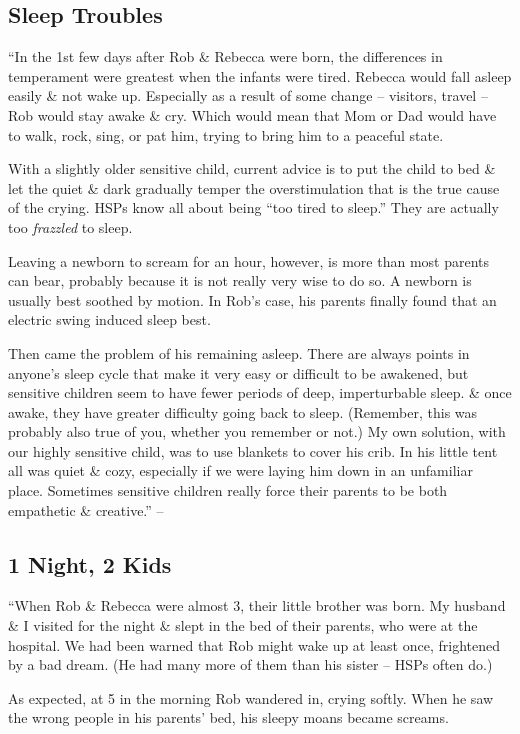 \documentclass{article}
\numberwithin{equation}{section}
\begin{document}
\subsection{Sleep Troubles}
``In the 1st few days after Rob \& Rebecca were born, the differences in temperament were greatest when the infants were tired. Rebecca would fall asleep easily \& not wake up. Especially as a result of some change -- visitors, travel -- Rob would stay awake \& cry. Which would mean that Mom or Dad would have to walk, rock, sing, or pat him, trying to bring him to a peaceful state.

With a slightly older sensitive child, current advice is to put the child to bed \& let the quiet \& dark gradually temper the overstimulation that is the true cause of the crying. HSPs know all about being ``too tired to sleep.'' They are actually too \textit{frazzled} to sleep.

Leaving a newborn to scream for an hour, however, is more than most parents can bear, probably because it is not really very wise to do so. A newborn is usually best soothed by motion. In Rob's case, his parents finally found that an electric swing induced sleep best.

Then came the problem of his remaining asleep. There are always points in anyone's sleep cycle that make it very easy or difficult to be awakened, but sensitive children seem to have fewer periods of deep, imperturbable sleep. \& once awake, they have greater difficulty going back to sleep. (Remember, this was probably also true of you, whether you remember or not.) My own solution, with our highly sensitive child, was to use blankets to cover his crib. In his little tent all was quiet \& cozy, especially if we were laying him down in an unfamiliar place. Sometimes sensitive children really force their parents to be both empathetic \& creative.'' -- \cite[pp. 58--59]{Aron2013}

\subsection{1 Night, 2 Kids}
``When Rob \& Rebecca were almost 3, their little brother was born. My husband \& I visited for the night \& slept in the bed of their parents, who were at the hospital. We had been warned that Rob might wake up at least once, frightened by a bad dream. (He had many more of them than his sister -- HSPs often do.)

As expected, at 5 in the morning Rob wandered in, crying softly. When he saw the wrong people in his parents' bed, his sleepy moans became screams.
\end{document}
